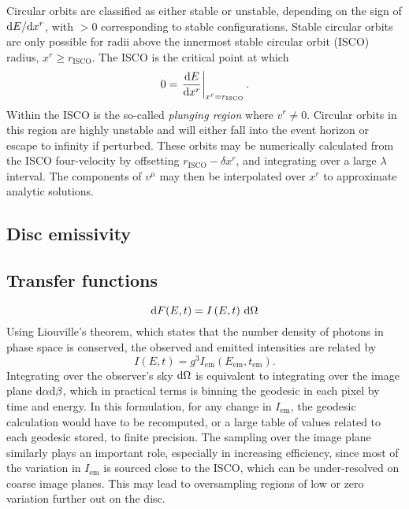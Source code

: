 Circular orbits are classified as either stable or unstable, depending on the sign of $\text{d} E / \text{d} x^r$, with $>0$ corresponding to stable configurations. Stable circular orbits are only possible for radii above the innermost stable circular orbit (ISCO) radius, $x^r \geq r_\text{ISCO}$. The ISCO is the critical point at which 
\begin{equation}
    0 = \left. \frac{\text{d} E}{\text{d} x^r} \right\rvert_{x^r = r_\text{ISCO}}.
\end{equation}
Within the ISCO is the so-called \textit{plunging region} where $v^r \neq 0$. Circular orbits in this region are highly unstable and will either fall into the event horizon or escape to infinity if perturbed. These orbits may be numerically calculated from the ISCO four-velocity by offsetting $r_\text{ISCO} -  \delta x^r$, and integrating over a large $\lambda$ interval. The components of $v^\mu$ may then be interpolated over $x^r$ to approximate analytic solutions.



\subsection{Disc emissivity}


\subsection{Transfer functions}

\begin{equation}
\text{d} F(E, t) = I\left(E, t\right)\, \text{d} \Omega
\end{equation}
Using Liouville's theorem, which states that the number density of photons in phase space is conserved, the observed and emitted intensities are related by
\begin{equation}
    I\left( E, t \right) = g^3 I_\text{em}\left(E_\text{em}, t_\text{em}\right).
\end{equation}
Integrating over the observer's sky $\text{d} \Omega$ is equivalent to integrating over the image plane $\text{d} \alpha \text{d} \beta$, which in practical terms is binning the geodesic in each pixel by time and energy. In this formulation, for any change in $I_\text{em}$, the geodesic calculation would have to be recomputed, or a large table of values related to each geodesic stored, to finite precision. The sampling over the image plane similarly plays an important role, especially in increasing efficiency, since most of the variation in $I_\text{em}$ is sourced close to the ISCO, which can be under-resolved on coarse image planes. This may lead to oversampling regions of low or zero variation further out on the disc.

